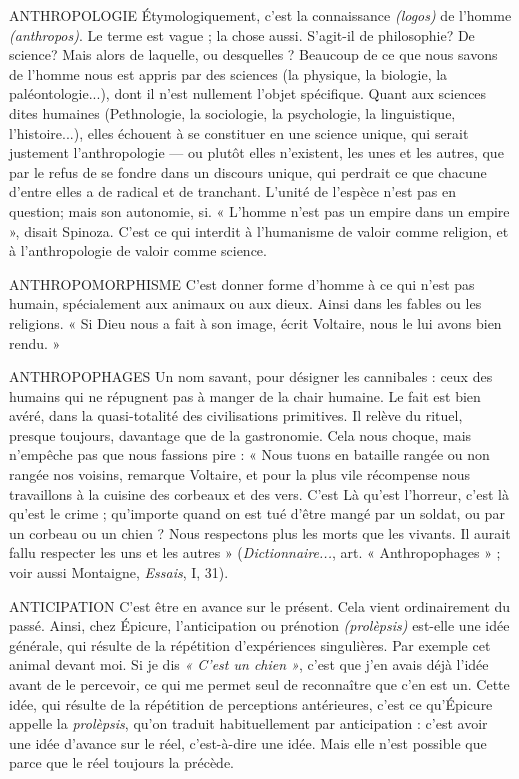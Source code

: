 ANTHROPOLOGIE Étymologiquement, c’est la connaissance {\it (logos)} de
l’homme {\it (anthropos)}. Le terme est vague ; la chose
aussi. S'agit-il de philosophie? De science? Mais alors de laquelle, ou
desquelles ? Beaucoup de ce que nous savons de l’homme nous est appris par
des sciences (la physique, la biologie, la paléontologie...), dont il n’est nullement
l’objet spécifique. Quant aux sciences dites humaines (Pethnologie, la
sociologie, la psychologie, la linguistique, l’histoire...), elles échouent à se constituer
en une science unique, qui serait justement l’anthropologie — ou plutôt
elles n’existent, les unes et les autres, que par le refus de se fondre dans un discours
unique, qui perdrait ce que chacune d’entre elles a de radical et de tranchant.
L'unité de l'espèce n’est pas en question; mais son autonomie, si.
« L'homme n’est pas un empire dans un empire », disait Spinoza. C’est ce qui
interdit à l’humanisme de valoir comme religion, et à l’anthropologie de valoir
comme science.

ANTHROPOMORPHISME C’est donner forme d’homme à ce qui n’est pas
humain, spécialement aux animaux ou aux
dieux. Ainsi dans les fables ou les religions. « Si Dieu nous a fait à son image,
écrit Voltaire, nous le lui avons bien rendu. »

ANTHROPOPHAGES Un nom savant, pour désigner les cannibales : ceux
des humains qui ne répugnent pas à manger de la
chair humaine. Le fait est bien avéré, dans la quasi-totalité des civilisations primitives.
Il relève du rituel, presque toujours, davantage que de la gastronomie.
Cela nous choque, mais n'empêche pas que nous fassions pire : « Nous tuons
en bataille rangée ou non rangée nos voisins, remarque Voltaire, et pour la plus
vile récompense nous travaillons à la cuisine des corbeaux et des vers. C’est Là
qu'est l’horreur, c’est là qu’est le crime ; qu'importe quand on est tué d’être
mangé par un soldat, ou par un corbeau ou un chien ? Nous respectons plus les
morts que les vivants. Il aurait fallu respecter les uns et les autres » ({\it Dictionnaire...},
art. « Anthropophages » ; voir aussi Montaigne, {\it Essais}, I, 31).

ANTICIPATION C'est être en avance sur le présent. Cela vient ordinairement
du passé. Ainsi, chez Épicure, l’anticipation ou prénotion
{\it (prolèpsis)} est-elle une idée générale, qui résulte de la répétition d’expériences
singulières. Par exemple cet animal devant moi. Si je dis {\it « C'est un chien »},
c'est que j'en avais déjà l’idée avant de le percevoir, ce qui me permet seul de
reconnaître que c’en est un. Cette idée, qui résulte de la répétition de perceptions
antérieures, c’est ce qu'Épicure appelle la {\it prolèpsis}, qu’on traduit habituellement
par anticipation : c’est avoir une idée d’avance sur le réel, c’est-à-dire une idée.
Mais elle n’est possible que parce que le réel toujours la précède.

